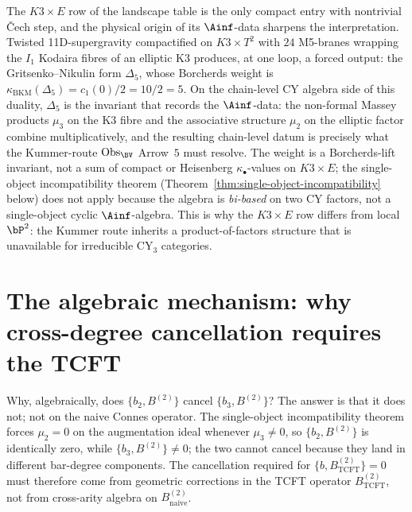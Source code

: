 \begin{remark}
\label{rem:m3b2-sugra-forcing}
The $K3 \times E$ row of the landscape table is the only compact
entry with nontrivial \v{C}ech step, and the physical origin of
its $\Ainf$-data sharpens the interpretation. Twisted
11D-supergravity compactified on $K3 \times T^2$ with $24$ M5-branes
wrapping the $I_1$ Kodaira fibres of an elliptic K3 produces, at
one loop, a forced output: the Gritsenko--Nikulin form
$\Delta_5$, whose Borcherds weight is
$\kappa_{\mathrm{BKM}}(\Delta_5)=c_1(0)/2=10/2=5$. On the chain-level CY algebra side of this
duality, $\Delta_5$ is the invariant that records the
$\Ainf$-data: the non-formal Massey products $\mu_3$ on the K3
fibre and the associative structure $\mu_2$ on the elliptic
factor combine multiplicatively, and the resulting chain-level
datum is precisely what the Kummer-route
$\mathrm{Obs}_{\BV}$ Arrow~$5$ must resolve. The weight is a
Borcherds-lift invariant, not a sum of compact or Heisenberg
$\kappa_\bullet$-values on $K3 \times E$; the single-object
incompatibility theorem (Theorem~\ref{thm:single-object-incompatibility}
below) does not apply because the algebra is
\emph{bi-based} on two CY factors, not a single-object cyclic
$\Ainf$-algebra. This is why the $K3 \times E$ row differs from
local~$\bP^2$: the Kummer route inherits a product-of-factors
structure that is unavailable for irreducible CY$_3$ categories.
\end{remark}


\section{The algebraic mechanism: why cross-degree cancellation
requires the TCFT}
\label{sec:m3b2-algebraic-mechanism}

Why, algebraically, does $\{b_2, B^{(2)}\}$ cancel
$\{b_3, B^{(2)}\}$? The answer is that it does not; not on
the naive Connes operator. The single-object incompatibility
theorem forces $\mu_2 = 0$ on the augmentation ideal whenever
$\mu_3 \neq 0$, so $\{b_2, B^{(2)}\}$ is identically zero, while
$\{b_3, B^{(2)}\} \neq 0$; the two cannot cancel because they
land in different bar-degree components. The cancellation
required for $\{b, B^{(2)}_{\mathrm{TCFT}}\}=0$ must therefore
come from geometric corrections in the TCFT operator
$B^{(2)}_{\mathrm{TCFT}}$, not from cross-arity algebra on
$B^{(2)}_{\mathrm{naive}}$.

